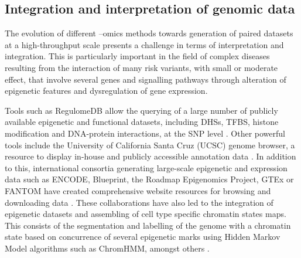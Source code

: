 
\subsection{Integration and interpretation of genomic data}
The evolution of different –omics methods towards generation of paired datasets at a high-throughput scale presents a challenge in terms of interpretation and integration. This is particularly important in the field of complex diseases resulting from the interaction of many risk variants, with small or moderate effect, that involve several genes and signalling pathways through alteration of epigenetic features and dysregulation of gene expression.

Tools such as RegulomeDB allow the querying of a large number of publicly available epigenetic and functional datasets, including DHSs, TFBS, histone modification and DNA-protein interactions, at the SNP level \parencite{Boyle2012}. Other powerful tools include the University of California Santa Cruz (UCSC) genome browser, a resource to display in-house and publicly accessible annotation data \parencite{Kent2002}. In addition to this,  international consortia generating large-scale epigenetic and expression data such as ENCODE, Blueprint, the Roadmap Epigenomics Project, GTEx or FANTOM have created comprehensive website resources for browsing and downloading data \parencite{ENCODE2007,Lonsdale2013, FANTOM2014,Adams2012 }. These collaborations have also led to the integration of epigenetic datasets and assembling of cell type specific chromatin states maps. This consists of the segmentation and labelling of the genome with a chromatin state based on concurrence of several epigenetic marks using Hidden Markov Model algorithms such as ChromHMM, amongst others \parencite{Ernst2010, Ernst2011,Hoffman2013, Kundaje2015 }. 

